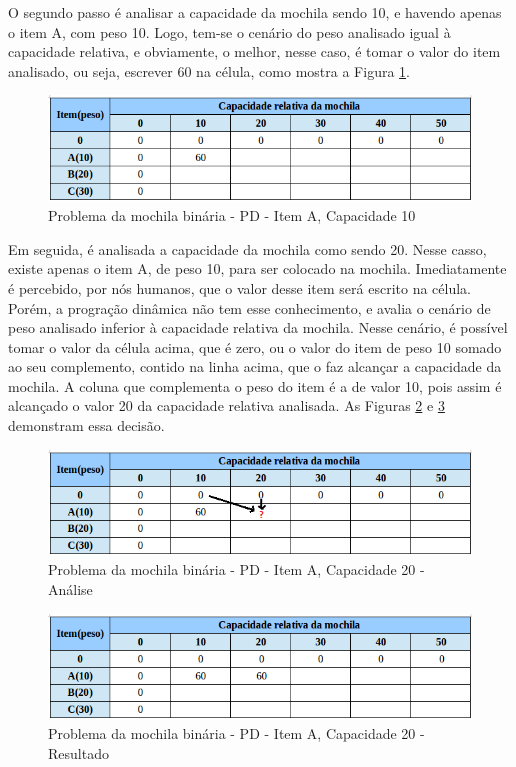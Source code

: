 \begin{itemize}
O segundo passo é analisar a capacidade da mochila sendo 10, e havendo apenas o item A, com peso 10. Logo, tem-se o cenário do peso analisado igual à capacidade relativa, e obviamente, o melhor, nesse caso, é tomar o valor do item analisado, ou seja, escrever 60 na célula, como mostra a Figura \ref{matriz60}.

\FloatBarrier
\begin{figure}[!h]
\centering
\includegraphics[keepaspectratio=true,scale=0.5]{figuras/matriz60.png}
\caption{Problema da mochila binária - PD - Item A, Capacidade 10}
\label{matriz60}
\end{figure}

Em seguida, é analisada a capacidade da mochila como sendo 20. Nesse casso, existe apenas o item A, de peso 10, para ser colocado na mochila. Imediatamente é percebido, por nós humanos, que o valor desse item será escrito na célula. Porém, a progração dinâmica não tem esse conhecimento, e avalia o cenário de peso analisado inferior à capacidade relativa da mochila. Nesse cenário, é possível tomar o valor da célula acima, que é zero, ou o valor do item de peso 10 somado ao seu complemento, contido na linha acima, que o faz alcançar a capacidade da mochila. A coluna que complementa o peso do item é a de valor 10, pois assim é alcançado o valor 20 da capacidade relativa analisada. As Figuras \ref{matriz10_20} e \ref{matriz10_20_resp} demonstram essa decisão.

\FloatBarrier
\begin{figure}[!h]
\centering
\includegraphics[keepaspectratio=true,scale=0.6]{figuras/matriz10_20.png}
\caption{Problema da mochila binária - PD - Item A, Capacidade 20 - Análise }
\label{matriz10_20}
\end{figure}

\FloatBarrier
\begin{figure}[!h]
\centering
\includegraphics[keepaspectratio=true,scale=0.6]{figuras/matriz10_20_resp.png}
\caption{Problema da mochila binária - PD - Item A, Capacidade 20 - Resultado}
\label{matriz10_20_resp}
\end{figure}


\end{itemize}

